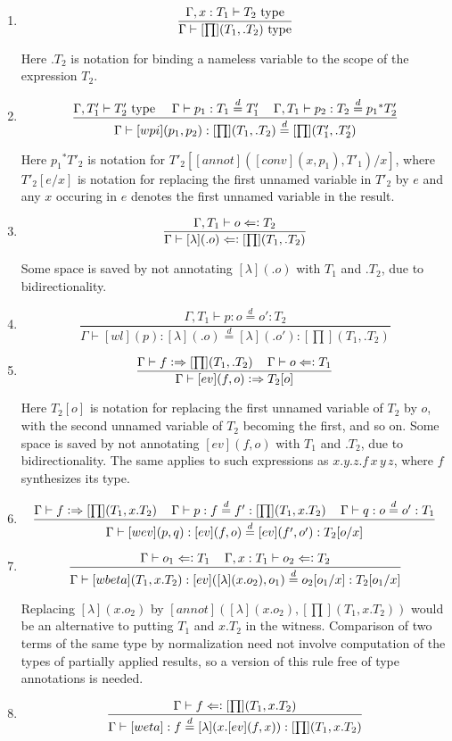 \documentclass[11pt]{article}
\newcommand{\eqd}{\stackrel{d}{=}}
\newcommand{\spc}{{\,\,\,\,\,\,\,}}
\newcommand{\synth}{\vcentcolon\Rightarrow}
\newcommand{\force}{\Leftarrow\vcentcolon}
\newcommand{\Type}{\mathop{{\, \rm type}}}
\begin{document}
\begin{enumerate}

\item 
$$\frac{\Gamma, x:T_1\vdash T_2\Type}{\Gamma\vdash [\prod](T_1,.T_2)\Type}$$

Here $.T_2$ is notation for binding a nameless variable to the scope of the expression $T_2$.

\item 
$$ \frac{ 
  \Gamma, T'_1 \vdash T'_2\Type \spc 
  \Gamma\vdash p_1:T_1\eqd T_1' \spc
  \Gamma, T_1 \vdash p_2:T_2\eqd {p_1}^*T_2'
  } {
  \Gamma\vdash [wpi](p_1,p_2):[\prod](T_1,.T_2)\eqd [\prod](T_1',.T'_2)
}$$

Here ${p_1}^*T'_2$ is notation for $T'_2[[annot]([conv](x,p_1),T'_1)/x]$,
where $T'_2[e/x]$ is notation for replacing the first unnamed variable in
$T'_2$ by $e$ and any $x$ occuring in $e$ denotes the first unnamed variable in
the result.

\item 
$$\frac{\Gamma, T_1\vdash o \force T_2}{\Gamma\vdash [\lambda](.o) \force [\prod](T_1,.T_2)}$$

Some space is saved by not annotating $[\lambda](.o)$ with $T_1$ and $.T_2$, due to bidirectionality.

\item 
$$\frac{\Gamma, T_1\vdash p : o\eqd o' : T_2}{\Gamma\vdash [wl](p) : [\lambda](.o)\eqd [\lambda](.o') : [\prod](T_1,.T_2)}$$

\item 
$$\frac{\Gamma\vdash f \synth [\prod](T_1,.T_2)\spc \Gamma\vdash o \force T_1}{\Gamma\vdash [ev](f,o) \synth T_2[o]}$$

Here $T_2[o]$ is notation for replacing the first unnamed variable of
$T_2$ by $o$, with the second unnamed variable of $T_2$ becoming the first, and
so on.  Some space is saved by not annotating $[ev](f,o)$ with $T_1$ and
$.T_2$, due to bidirectionality.  The same applies to such expressions as
$x.y.z.f\, x\, y\, z$, where $f$ synthesizes its type.

\item 
$$\frac{\Gamma\vdash f \synth [\prod](T_1,x.T_2) \spc \Gamma\vdash p : f \eqd f' : [\prod](T_1,x.T_2)\spc \Gamma\vdash q : o \eqd o' : T_1}{\Gamma\vdash [wev](p,q) : [ev](f,o) \eqd [ev](f',o') : T_2[o/x]}$$

\item 
$$\frac{ \Gamma\vdash o_1 \force T_1\spc \Gamma, x:T_1\vdash o_2 \force T_2}{\Gamma\vdash [wbeta](T_1,x.T_2) : [ev]([\lambda](x.o_2),o_1) \eqd o_2[o_1/x] : T_2[o_1/x]}$$

Replacing $[\lambda](x.o_2)$ by $[annot]([\lambda](x.o_2),[\prod](T_1,x.T_2))$ would be an alternative to putting $T_1$ and $x.T_2$ in the witness.
Comparison of two terms of the same type by normalization need not involve
computation of the types of partially applied results, so a version of this
rule free of type annotations is needed.

\item 
$$\frac{\Gamma\vdash f \force [\prod](T_1,x.T_2)}{\Gamma\vdash [weta] : f \eqd [\lambda](x.[ev](f,x)) : [\prod](T_1,x.T_2)}$$ 

\end{enumerate}



\end{document}
